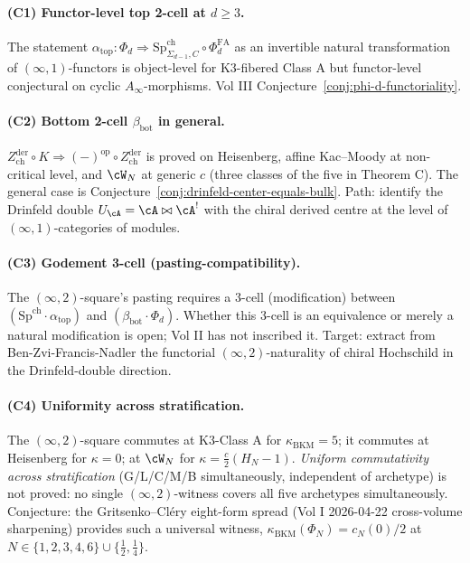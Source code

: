 \paragraph*{(C1) Functor-level top 2-cell at $d\geq 3$.} The statement
$\alpha_{\mathrm{top}}\colon \Phi_d\Rightarrow
\mathrm{Sp}^{\mathrm{ch}}_{\Sigma_{d-1},C}\circ \Phi^{\mathrm{FA}}_d$
as an invertible natural transformation of $(\infty,1)$-functors is
object-level for K3-fibered Class A but functor-level conjectural on
cyclic $A_\infty$-morphisms. Vol III
Conjecture~\ref{conj:phi-d-functoriality}.

\paragraph*{(C2) Bottom 2-cell $\beta_{\mathrm{bot}}$ in general.}
$Z^{\mathrm{der}}_{\mathrm{ch}}\circ K\Rightarrow(-)^{\mathrm{op}}\circ
Z^{\mathrm{der}}_{\mathrm{ch}}$ is proved on Heisenberg, affine
Kac--Moody at non-critical level, and $\cW_N$ at generic $c$ (three
classes of the five in Theorem C). The general case is
Conjecture~\ref{conj:drinfeld-center-equals-bulk}. Path: identify the
Drinfeld double $U_\cA = \cA\bowtie\cA^!$ with the chiral derived
centre at the level of $(\infty,1)$-categories of modules.

\paragraph*{(C3) Godement 3-cell (pasting-compatibility).} The
$(\infty,2)$-square's pasting requires a 3-cell (modification) between
$(\mathrm{Sp}^{\mathrm{ch}}\cdot\alpha_{\mathrm{top}})$ and
$(\beta_{\mathrm{bot}}\cdot\Phi_d)$. Whether this 3-cell is an
equivalence or merely a natural modification is open; Vol II has not
inscribed it. Target: extract from Ben-Zvi-Francis-Nadler \cite{BFN2010} the
functorial $(\infty,2)$-naturality of chiral Hochschild in the
Drinfeld-double direction.

\paragraph*{(C4) Uniformity across stratification.} The $(\infty,2)$-square
commutes at K3-Class A for $\kappa_{\mathrm{BKM}}=5$; it commutes at
Heisenberg for $\kappa=0$; at $\cW_N$ for $\kappa=\tfrac{c}{2}(H_N-1)$.
\emph{Uniform commutativity across stratification} (G/L/C/M/B simultaneously,
independent of archetype) is not proved: no single $(\infty,2)$-witness
covers all five archetypes simultaneously. Conjecture: the
Gritsenko--Cl\'ery eight-form spread (Vol I 2026-04-22
cross-volume sharpening) provides such a universal witness,
$\kappa_{\mathrm{BKM}}(\Phi_N)=c_N(0)/2$ at
$N\in\{1,2,3,4,6\}\cup\{\tfrac12,\tfrac14\}$.

